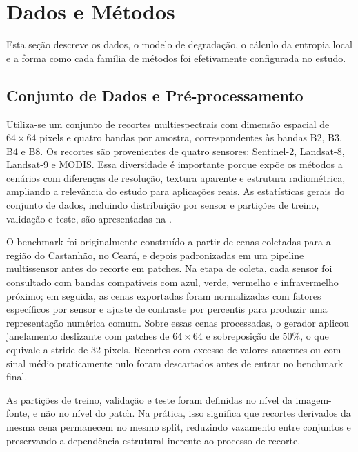 \section{Dados e Métodos}
\label{sec:methods}

Esta seção descreve os dados, o modelo de degradação, o cálculo da entropia local e a forma como cada família de métodos foi efetivamente configurada no estudo.

\subsection{Conjunto de Dados e Pré-processamento}
\label{sec:dataset}

Utiliza-se um conjunto de recortes multiespectrais com dimensão espacial de $64\times64$ pixels e quatro bandas por amostra, correspondentes às bandas B2, B3, B4 e B8.
Os recortes são provenientes de quatro sensores: Sentinel-2, Landsat-8, Landsat-9 e MODIS.
Essa diversidade é importante porque expõe os métodos a cenários com diferenças de resolução, textura aparente e estrutura radiométrica, ampliando a relevância do estudo para aplicações reais.
As estatísticas gerais do conjunto de dados, incluindo distribuição por sensor e partições de treino, validação e teste, são apresentadas na .

O benchmark foi originalmente construído a partir de cenas coletadas para a região do Castanhão, no Ceará, e depois padronizadas em um pipeline multissensor antes do recorte em patches.
Na etapa de coleta, cada sensor foi consultado com bandas compatíveis com azul, verde, vermelho e infravermelho próximo; em seguida, as cenas exportadas foram normalizadas com fatores específicos por sensor e ajuste de contraste por percentis para produzir uma representação numérica comum.
Sobre essas cenas processadas, o gerador aplicou janelamento deslizante com patches de $64\times64$ e sobreposição de 50\%, o que equivale a stride de 32 pixels.
Recortes com excesso de valores ausentes ou com sinal médio praticamente nulo foram descartados antes de entrar no benchmark final.

As partições de treino, validação e teste foram definidas no nível da imagem-fonte, e não no nível do patch.
Na prática, isso significa que recortes derivados da mesma cena permanecem no mesmo split, reduzindo vazamento entre conjuntos e preservando a dependência estrutural inerente ao processo de recorte.

